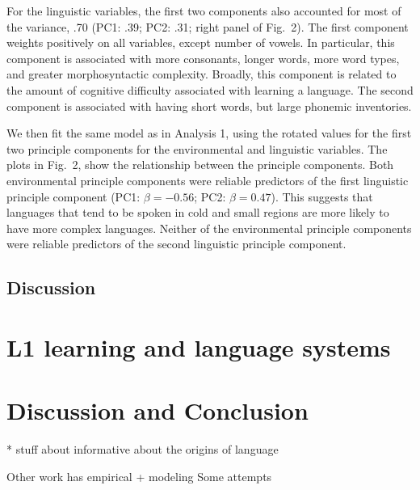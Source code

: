 \documentclass[10pt,letterpaper]{article}
\begin{document}
For the linguistic variables, the first two components also accounted for most of the variance, .70 (PC1: .39; PC2: .31; right panel of Fig.\ 2). The first component weights positively on all variables, except number of vowels. In particular, this component is associated with more consonants, longer words, more word types, and greater morphosyntactic complexity. Broadly, this component is related to the amount of cognitive difficulty associated with learning a language. The second component is associated with having short words, but large phonemic inventories. 

We then fit the same model as in Analysis 1,  using the rotated values for the first two principle components for the environmental and linguistic variables. The plots in Fig.\ 2, show the relationship between the principle components. Both environmental principle components were reliable predictors of the first linguistic principle component (PC1: $\beta=-0.56$; PC2: $\beta=0.47$). This suggests that languages that tend to be  spoken in cold and small regions are more likely to have more complex languages. Neither of the environmental principle components were reliable predictors of the second linguistic principle component.

\subsection{Discussion}


\section{L1 learning and language systems}
\cite{luniewska2015ratings}




\section{Discussion and Conclusion}

* stuff about informative about the origins of language

 Other work has empirical + modeling
Some attempts
\cite{silvey2015word}
\cite{perfors2011language}




\cite{wichmann2011phonological}
\cite{wichmann2008languagephonological}
\cite{smith2010eliminating}
\cite{slobin1982children}
\end{document}
